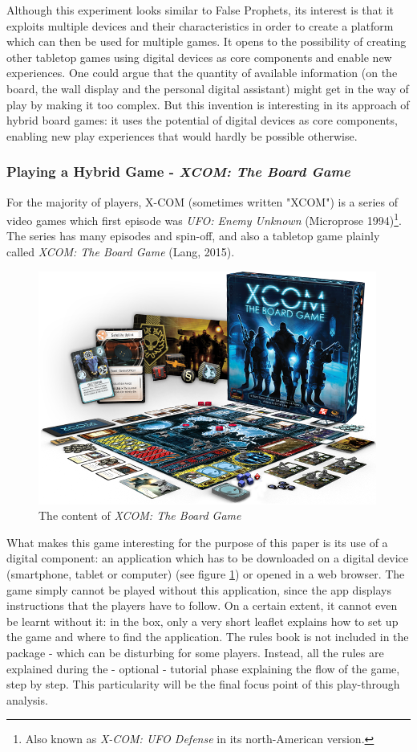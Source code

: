 Although this experiment looks similar to False Prophets, its interest is that it exploits multiple devices and their characteristics in order to create a platform which can then be used for multiple games. It opens to the possibility of creating other tabletop games using digital devices as core components and enable new experiences. One could argue that the quantity of available information (on the board, the wall display and the personal digital assistant) might get in the way of play by making it too complex. But this invention is interesting in its approach of hybrid board games: it uses the potential of digital devices as core components, enabling new play experiences that would hardly be possible otherwise.

\subsubsection{Playing a Hybrid Game - \textit{XCOM: The Board Game}}
For the majority of players, X-COM (sometimes written "XCOM") is a series of video games which first episode was \textit{UFO: Enemy Unknown}\cite{game:xcom} (Microprose 1994)\footnote{Also known as \textit{X-COM: UFO Defense} in its north-American version.}. The series has many episodes and spin-off, and also a tabletop game plainly called \textit{XCOM: The Board Game} (Lang, 2015)\cite{game:xcomtbg}.

\begin{figure}[h]
    \centering
    \includegraphics[scale=0.5]{Images/xc01_layout.png}
    \caption{The content of \textit{XCOM: The Board Game}}
    \label{fig:XCOMBG}
\end{figure}

What makes this game interesting for the purpose of this paper is its use of a digital component: an application which has to be downloaded on a digital device (smartphone, tablet or computer) (see figure \ref{fig:XCOMBG}) or opened in a web browser. The game simply cannot be played without this application, since the app displays instructions that the players have to follow. On a certain extent, it cannot even be learnt without it: in the box, only a very short leaflet explains how to set up the game and where to find the application. The rules book is not included in the package - which can be disturbing for some players. Instead, all the rules are explained during the - optional - tutorial phase explaining the flow of the game, step by step. This particularity will be the final focus point of this play-through analysis.

